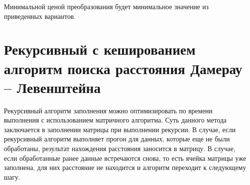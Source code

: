 Минимальной ценой преобразования будет минимальное значение из приведенных вариантов.

\section{Рекурсивный с кешированием алгоритм поиска расстояния Дамерау -- Левенштейна}

Рекурсивный алгоритм заполнения можно оптимизировать по времени выполнения с использованием матричного алгоритма. Суть данного метода заключается в заполнении матрицы при выполнении рекурсии. В случае, если рекурсивный алгоритм выполняет прогон для данных, которые еще не были обработаны, результат нахождения расстояния заносится в матрицу. В случае, если обработанные ранее данные встречаются снова, то есть ячейка матрицы уже заполнена, для них расстояние не находится и алгоритм переходит к следующему шагу.
